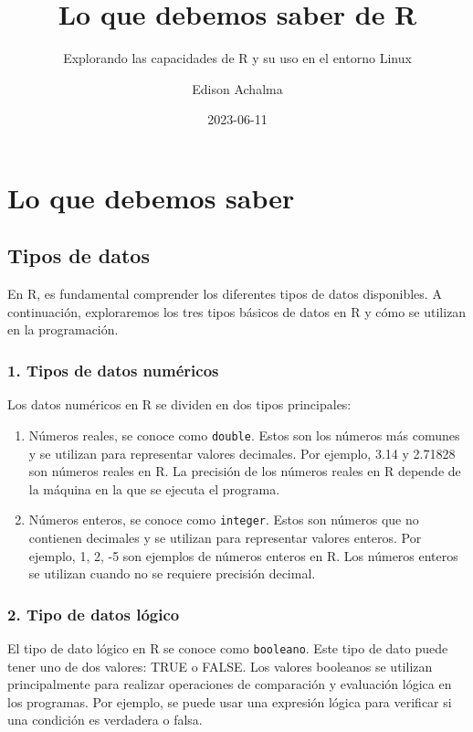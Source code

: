 \documentclass[
  a4paper,
]{article}
\title{Lo que debemos saber de R}
\subtitle{Explorando las capacidades de R y su uso en el entorno Linux}
\author{Edison Achalma}
\date{2023-06-11}
\begin{document}
\maketitle

\section{Lo que debemos saber}\label{lo-que-debemos-saber}

\subsection{Tipos de datos}\label{tipos-de-datos}

En R, es fundamental comprender los diferentes tipos de datos
disponibles. A continuación, exploraremos los tres tipos básicos de
datos en R y cómo se utilizan en la programación.

\subsubsection{1. Tipos de datos
numéricos}\label{tipos-de-datos-numuxe9ricos}

Los datos numéricos en R se dividen en dos tipos principales:

\begin{enumerate}
\def\labelenumi{\alph{enumi}.}
\item
  Números reales, se conoce como \texttt{double}. Estos son los números
  más comunes y se utilizan para representar valores decimales. Por
  ejemplo, 3.14 y 2.71828 son números reales en R. La precisión de los
  números reales en R depende de la máquina en la que se ejecuta el
  programa.
\item
  Números enteros, se conoce como \texttt{integer}. Estos son números
  que no contienen decimales y se utilizan para representar valores
  enteros. Por ejemplo, 1, 2, -5 son ejemplos de números enteros en R.
  Los números enteros se utilizan cuando no se requiere precisión
  decimal.
\end{enumerate}

\subsubsection{2. Tipo de datos lógico}\label{tipo-de-datos-luxf3gico}

El tipo de dato lógico en R se conoce como \texttt{booleano}. Este tipo
de dato puede tener uno de dos valores: TRUE o FALSE. Los valores
booleanos se utilizan principalmente para realizar operaciones de
comparación y evaluación lógica en los programas. Por ejemplo, se puede
usar una expresión lógica para verificar si una condición es verdadera o
falsa.
\end{document}
